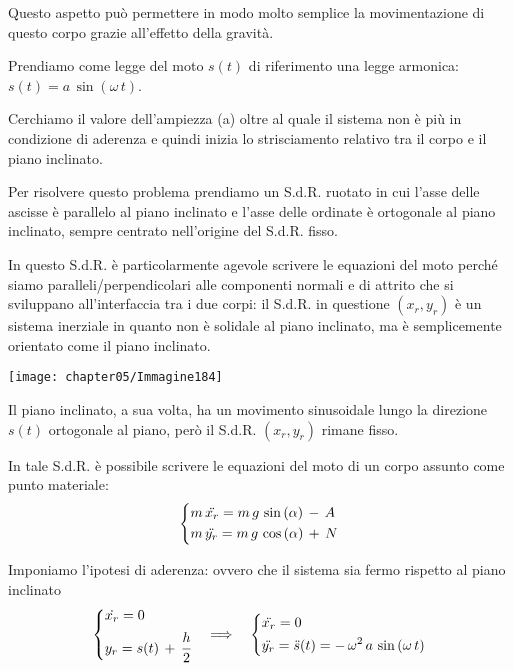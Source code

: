 Questo aspetto può permettere in modo molto semplice la movimentazione di questo corpo grazie all'effetto della gravità.

Prendiamo come legge del moto $s(t)$ di riferimento una legge armonica: $s(t) = a\,\sin{(\omega\,t)}$.

Cerchiamo il valore dell'ampiezza (a) oltre al quale il sistema non è più in condizione di aderenza e quindi inizia lo strisciamento relativo tra il corpo e il piano inclinato.

Per risolvere questo problema prendiamo un S.d.R. ruotato in cui l'asse delle ascisse è parallelo al piano inclinato e l'asse delle ordinate è ortogonale al piano inclinato, sempre centrato nell'origine del S.d.R. fisso.

In questo S.d.R. è particolarmente agevole scrivere le equazioni del moto perché siamo paralleli/perpendicolari alle componenti normali e di attrito che si sviluppano all'interfaccia tra i due corpi: il S.d.R. in questione $(x_r, y_r)$ è un sistema inerziale in quanto non è solidale al piano inclinato, ma è semplicemente orientato come il piano inclinato.

\begin{minipage}{.35\textwidth}
\centering
\texttt{[image: chapter05/Immagine184]}
\end{minipage}
\hfill
\begin{minipage}{.65\textwidth}
Il piano inclinato, a sua volta, ha un movimento sinusoidale lungo la direzione $s(t)$ ortogonale al piano, però il S.d.R. $(x_r, y_r)$ rimane fisso.

In tale S.d.R. è possibile scrivere le equazioni del moto di un corpo assunto come punto materiale:
\[
\begin{dcases}
m\,\ddot{x_r} = m\,g\,\sin{(\alpha)}\,-\,A\\
m\,\ddot{y_r} = m\,g\,\cos{(\alpha)}\,+\,N
\end{dcases}
\]
\end{minipage}

Imponiamo l'ipotesi di  aderenza: ovvero che il sistema sia fermo rispetto al piano inclinato
\[\begin{dcases}
\dot{x_r} = 0\\
y_r = s(t)\,+\,\cfrac{h}{2}
\end{dcases}
\quad
\Longrightarrow
\quad
\begin{dcases}
\ddot{x_r} = 0\\
\ddot{y_r} = \ddot{s}(t) = -\,\omega^2\,a\,\sin{(\omega\,t)}
\end{dcases}\]


